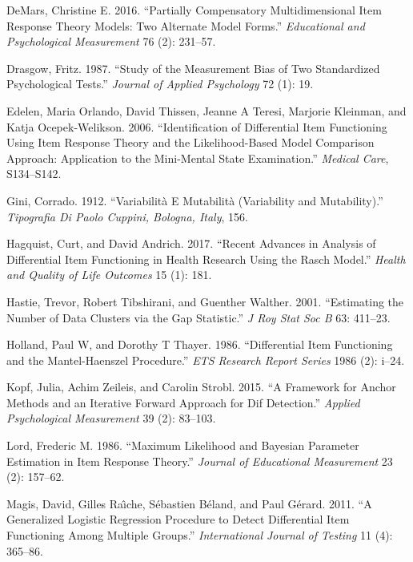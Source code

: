 \documentclass[
  11pt,
]{article}
\begin{document}
\leavevmode\hypertarget{ref-demars2016partially}{}%
DeMars, Christine E. 2016. ``Partially Compensatory Multidimensional Item Response Theory Models: Two Alternate Model Forms.'' \emph{Educational and Psychological Measurement} 76 (2): 231--57.

\leavevmode\hypertarget{ref-drasgow1987study}{}%
Drasgow, Fritz. 1987. ``Study of the Measurement Bias of Two Standardized Psychological Tests.'' \emph{Journal of Applied Psychology} 72 (1): 19.

\leavevmode\hypertarget{ref-edelen2006identification}{}%
Edelen, Maria Orlando, David Thissen, Jeanne A Teresi, Marjorie Kleinman, and Katja Ocepek-Welikson. 2006. ``Identification of Differential Item Functioning Using Item Response Theory and the Likelihood-Based Model Comparison Approach: Application to the Mini-Mental State Examination.'' \emph{Medical Care}, S134--S142.

\leavevmode\hypertarget{ref-gini1912variabilita}{}%
Gini, Corrado. 1912. ``Variabilità E Mutabilità (Variability and Mutability).'' \emph{Tipografia Di Paolo Cuppini, Bologna, Italy}, 156.

\leavevmode\hypertarget{ref-hagquist2017recent}{}%
Hagquist, Curt, and David Andrich. 2017. ``Recent Advances in Analysis of Differential Item Functioning in Health Research Using the Rasch Model.'' \emph{Health and Quality of Life Outcomes} 15 (1): 181.

\leavevmode\hypertarget{ref-hastie2001estimating}{}%
Hastie, Trevor, Robert Tibshirani, and Guenther Walther. 2001. ``Estimating the Number of Data Clusters via the Gap Statistic.'' \emph{J Roy Stat Soc B} 63: 411--23.

\leavevmode\hypertarget{ref-holland1986differential}{}%
Holland, Paul W, and Dorothy T Thayer. 1986. ``Differential Item Functioning and the Mantel-Haenszel Procedure.'' \emph{ETS Research Report Series} 1986 (2): i--24.

\leavevmode\hypertarget{ref-kopf2015framework}{}%
Kopf, Julia, Achim Zeileis, and Carolin Strobl. 2015. ``A Framework for Anchor Methods and an Iterative Forward Approach for Dif Detection.'' \emph{Applied Psychological Measurement} 39 (2): 83--103.

\leavevmode\hypertarget{ref-lord1986maximum}{}%
Lord, Frederic M. 1986. ``Maximum Likelihood and Bayesian Parameter Estimation in Item Response Theory.'' \emph{Journal of Educational Measurement} 23 (2): 157--62.

\leavevmode\hypertarget{ref-magis2011generalized}{}%
Magis, David, Gilles Raı̂che, Sébastien Béland, and Paul Gérard. 2011. ``A Generalized Logistic Regression Procedure to Detect Differential Item Functioning Among Multiple Groups.'' \emph{International Journal of Testing} 11 (4): 365--86.
\end{document}
